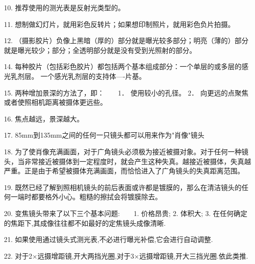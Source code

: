 10. 推荐使用的测光表是反射光类型的。

11. 想制做幻灯片，就用彩色反转片；如果想印制照片，就用彩色负片拍摄。

12. （摄影胶片）负像上黑暗（厚的）部分就是曝光较多部分；明亮（薄的）部分就是曝光较少；部分；全透明部分就是没有受到光照射的部分。

14. 每种胶片（包括彩色胶片）都包括两个基本组成部分：一个单层的或多层的感光乳剂层。 一个感光乳剂层的支持体----片基。

15. 两种增加景深的方法了，即：　　1． 使用较小的孔径。 2． 向更远的点聚焦或者使照相机距离被摄体更远些。

16. 焦点越远，景深越大。

17. 85mm到135mm之间的任何一只镜头都可以用来作为"肖像"镜头

18. 为了使肖像充满画面，对于广角镜头必须极为接近被摄对象。对于任何一种镜头，当非常接近被摄体到一定程度时，就会产生这种失真。越接近被摄体，失真越严重。正是由于希望被摄体充满画面，而恰恰进入了广角镜头的失真距离范围。

19. 既然已经了解到照相机镜头的前后表面或许都是镀膜的，那么在清洁镜头的任何一端时都要格外小心。粗糙的擦拭会将镀膜除去。

20. 变焦镜头带来了以下三个基本问题:　　1. 价格昂贵; 2. 体积大; 3. 在任何确定的焦距下,其成像往往都不如最好的定焦镜头成像清晰.

21. 如果使用通过镜头式测光表,不必进行曝光补偿,它会进行自动调整.

22. 对于2×远摄增距镜,开大两挡光圈,对于3×远摄增距镜,开大三挡光圈.依此类推.

